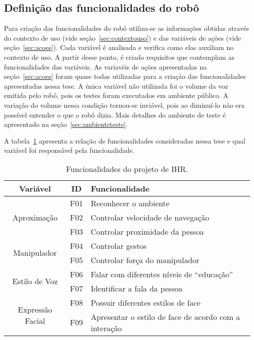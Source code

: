 \subsection{Definição das funcionalidades do robô}
\label{sec:funcionalidades}
Para criação das funcionalidades do robô utiliza-se as informações obtidas através do contexto de uso (vide seção~\ref{sec:contextouso}) e das variáveis de ações (vide seção~\ref{sec:acoes}). Cada variável é analisada e verifica como elas auxiliam no contexto de uso. A partir desse ponto, é criado requisitos que contemplam as funcionalidades das variáveis. As variavéis de ações apresentadas na seção~\ref{sec:acoes} foram quase todas utilizadas para a criação das funcionalidades apresentadas nessa tese. A única variável não utilizada foi o volume da voz emitida pelo robô, pois os testes foram executados em ambiente público. A variação do volume nessa condição tornou-se inviável, pois ao diminuí-lo não era possível entender o que o robô dizia. Mais detalhes do ambiente de teste é apresentado na seção~\ref{sec:ambienteteste}.

A tabela~\ref{tab:funcionalidades} apresenta a relação de funcionalidades consideradas nessa tese e qual variável foi responsável pela funcionalidade.

\begin{table}[!ht]
	\caption{Funcionalidades do projeto de IHR.}
	\label{tab:funcionalidades}
	\centering
	\begin{tabular}{c | c | l}
        \hline
        Variável & ID & Funcionalidade \\
        \hline
		\multirow{3}{*}{Aproximação} & F01 & Reconhecer o ambiente \\
        \hhline{~--}
        & F02 & Controlar velocidade de navegação \\
        \hhline{~--}
        & F03 & Controlar proximidade da pessoa \\
        \hline
		\multirow{2}{*}{Manipulador} & F04 & Controlar gestos \\
        \hhline{~--}
        & F05 & Controlar força do manipulador \\
        \hline
		\multirow{2}{*}{Estilo de Voz} & F06 & Falar com diferentes níveis de ``educação'' \\
        \hhline{~--}
        & F07 & Identificar a fala da pessoa \\
        \hline
		\multirow{2}{*}{Expressão Facial} & F08 & Possuir diferentes estilos de face \\
		\hhline{~--}
		& F09 & Apresentar o estilo de face de acordo com a interação \\
		\hline
	\end{tabular}
\end{table}

